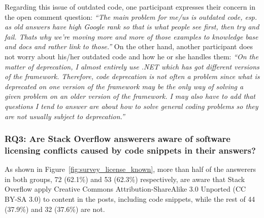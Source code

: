 \documentclass{svjour3}                     %
\begin{document}
Regarding this issue of outdated code, one participant expresses their concern
in the open comment question: \textit{``The main problem for me/us is outdated
	code, esp. as old answers have high Google rank so that is what people see
	first, then try and fail. Thats why we're moving more and more of those examples
	to knowledge base and docs and rather link to those.''} On the other hand,
another participant does not  worry about his/her outdated code and how he
or she handles them: \textit{``On
	the matter of deprecation, I almost entirely use .NET which has got different
	versions of the framework. Therefore, code deprecation is not often a problem
	since what is deprecated on one version of the framework may be the only way of
	solving a given problem on an older version of the framework. I may also have to
	add that questions I tend to answer are about how to solve general coding
	problems so they are not usually subject to deprecation.''}

\vspace{0.5cm} \noindent{}
\vspace{0.5cm}

\subsubsection*{RQ3: Are Stack Overflow answerers aware of software licensing
	conflicts caused by code snippets in their answers?}

As shown in Figure~\ref{fig:survey_license_known}, more than half of the
answerers in both groups, 72 (62.1\%) and 53 (62.3\%) respectively, are aware that Stack
Overflow apply Creative Commons Attribution-ShareAlike 3.0 Unported (CC BY-SA
3.0) to content in the posts, including code snippets, while the rest of 44 (37.9\%)
and 32 (37.6\%) are not. 
\end{document}
